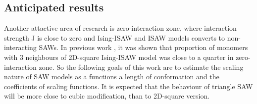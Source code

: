 \subsection{Anticipated results}

Another attactive area of research is zero-interaction zone, where interaction strength J is close to zero and Ising-ISAW and ISAW models converts to non-interacting SAWs.
In previous work \cite{faizullina2021critical}, it was shown that proportion of monomers with 3 neighbours of 2D-square Ising-ISAW model was close to a quarter in zero-interaction zone.
So the following goals of this work are to estimate the scaling nature of SAW models as a functions a length of conformation and the coefficients of scaling functions.
It is expected that the behaviour of triangle SAW will be more close to cubic modification, than to 2D-square version. 


 
